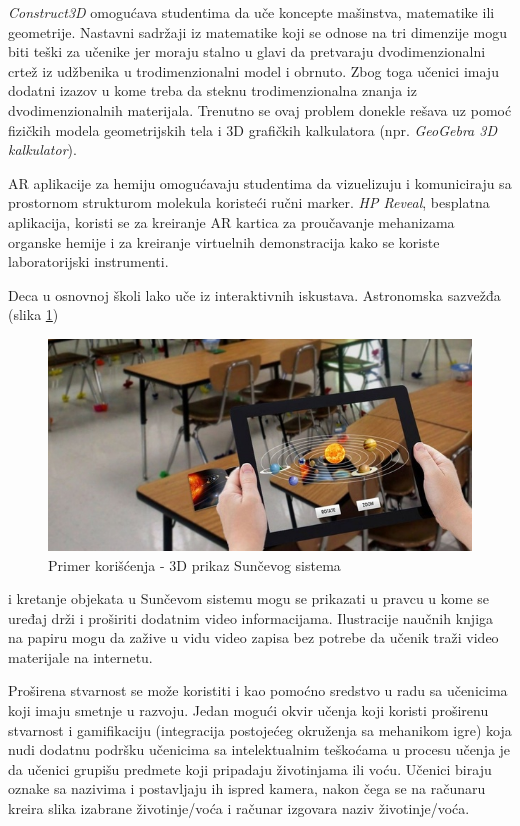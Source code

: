 \documentclass[a4paper]{article}
\begin{document}
	\emph{Construct3D} omogućava studentima da uče koncepte mašinstva, matematike ili geometrije. Nastavni sadržaji iz matematike koji se odnose na tri dimenzije mogu biti teški za učenike 
	jer moraju stalno u glavi da pretvaraju dvodimenzionalni crtež iz udžbenika u trodimenzionalni model i obrnuto. Zbog toga učenici imaju dodatni izazov u kome treba da steknu 
	trodimenzionalna znanja iz dvodimenzionalnih materijala. Trenutno se ovaj problem donekle rešava uz pomoć fizičkih modela geometrijskih tela i 3D grafičkih kalkulatora (npr. \emph{GeoGebra 3D kalkulator}). \cite{Proširena stvarnost}
	
	AR aplikacije za hemiju omogućavaju studentima da vizuelizuju i komuniciraju sa prostornom strukturom molekula koristeći ručni marker. \emph{HP Reveal}, besplatna aplikacija, koristi 
	se za kreiranje AR kartica za proučavanje mehanizama organske hemije i za kreiranje virtuelnih demonstracija kako se koriste laboratorijski instrumenti. \cite{Proširena stvarnost}

	Deca u osnovnoj školi lako uče iz interaktivnih iskustava. Astronomska sazvežđa (slika \ref{fig:Primer korišćenja - 3D prikaz Sunčevog sistema})
	\begin{figure}[h!]
		\begin{center}
		\includegraphics[scale=0.5]{primerkorišćenja.jpg}
		\end{center}
		\caption{Primer korišćenja - 3D prikaz Sunčevog sistema}
		\label{fig:Primer korišćenja - 3D prikaz Sunčevog sistema}
		\end{figure}
	i kretanje objekata u Sunčevom sistemu mogu se prikazati u pravcu u kome se uređaj drži
	i proširiti dodatnim video informacijama. Ilustracije naučnih knjiga na papiru mogu da zažive u vidu video zapisa bez potrebe da učenik traži video materijale na internetu.

	Proširena stvarnost se može koristiti i kao pomoćno sredstvo u radu sa učenicima koji imaju smetnje u razvoju. Jedan mogući okvir učenja koji koristi proširenu stvarnost 
	i gamifikaciju (integracija postojećeg okruženja sa mehanikom igre) koja nudi dodatnu podršku učenicima sa intelektualnim teškoćama u procesu učenja je da učenici grupišu predmete koji pripadaju životinjama ili voću. 
	Učenici biraju oznake sa nazivima i postavljaju ih ispred kamera, nakon čega se na računaru kreira slika izabrane životinje/voća i računar izgovara naziv životinje/voća. \cite{Upotreba kod dece sa intelektualnim teškoćama}
\end{document}
